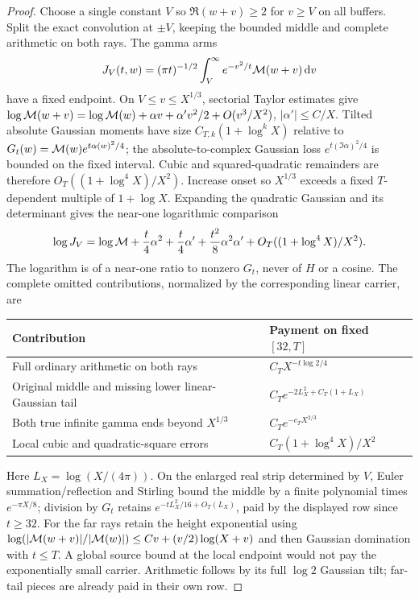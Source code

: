 \begin{proof}
Choose a single constant $V$ so $\Re(w+v)\ge2$ for $v\ge V$
on all buffers. Split the exact convolution at $\pm V$, keeping
the bounded middle and complete arithmetic on both rays. The gamma
arms
\[
 J_V(t,w)=(\pi t)^{-1/2}\int_V^\infty e^{-v^2/t}\mathcal M(w+v)\,\mathrm d v
\]
have a fixed endpoint. On $V\le v\le X^{1/3}$, sectorial Taylor
estimates give
$\log\mathcal M(w+v)=\log\mathcal M(w)+\alpha v+\alpha'v^2/2+O(v^3/X^2)$,
$|\alpha'|\le C/X$. Tilted absolute Gaussian moments have size
$C_{T,k}(1+\log^kX)$ relative to
$G_t(w)=\mathcal M(w)e^{t\alpha(w)^2/4}$; the absolute-to-complex
Gaussian loss $e^{t(\Im\alpha)^2/4}$ is bounded on the fixed
interval. Cubic and squared-quadratic remainders are therefore
$O_T((1+\log^4X)/X^2)$. Increase onset so $X^{1/3}$ exceeds a
fixed $T$-dependent multiple of $1+\log X$. Expanding the quadratic
Gaussian and its determinant gives the near-one logarithmic comparison
\begin{equation}
 \log J_V=\log\mathcal M+\frac t4\alpha^2+\frac t4\alpha'
                      +\frac{t^2}8\alpha^2\alpha'
                      +O_T((1+\log^4X)/X^2).
 \label{eq:compact-log-arm}
\end{equation}
The logarithm is of a near-one ratio to nonzero $G_t$, never of $H$
or a cosine. The complete omitted contributions, normalized by the
corresponding linear carrier, are
\begin{center}\small
\begin{tabular}{@{}p{}p{}@{}}\toprule
Contribution & Payment on fixed $[32,T]$\\\midrule
Full ordinary arithmetic on both rays & $C_TX^{-t\log2/4}$\\
Original middle and missing lower linear-Gaussian tail &
$C_Te^{-2L_X^2+C_T(1+L_X)}$\\
Both true infinite gamma ends beyond $X^{1/3}$ &
$C_Te^{-c_TX^{2/3}}$\\
Local cubic and quadratic-square errors &
$C_T(1+\log^4X)/X^2$\\\bottomrule
\end{tabular}
\end{center}
Here $L_X=\log(X/(4\pi))$. On the enlarged real strip determined
by $V$, Euler summation/reflection and Stirling bound the middle by
a finite polynomial times $e^{-\pi X/8}$; division by $G_t$
retains $e^{-tL_X^2/16+O_T(L_X)}$, paid by the displayed row since
$t\ge32$. For the far rays retain the height exponential using
$\log(|\mathcal M(w+v)|/|\mathcal M(w)|)\le Cv+(v/2)\log(X+v)$ and then
Gaussian domination with $t\le T$. A global source bound at the
local endpoint would not pay the exponentially small carrier.
Arithmetic follows by its full $\log2$ Gaussian tilt; far-tail
pieces are already paid in their own row.


\end{proof}
